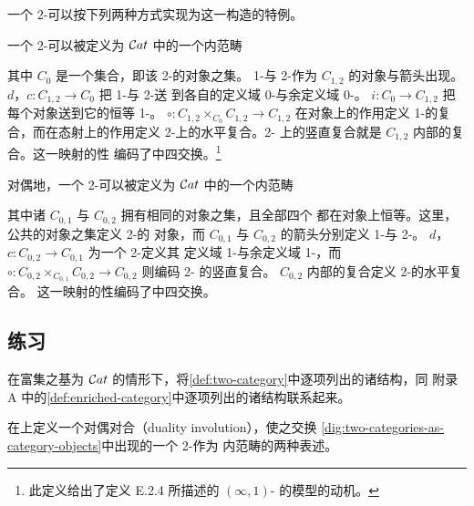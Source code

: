 一个 2-\trCategory{}可以按下列两种方式实现为这一构造的特例。

\begin{digression}\label{dig:two-categories-as-category-objects}
一个 2-\trCategory{}可以被定义为 $\mathcal{C}at$ 中的一个内范畴
\begin{center}
\end{center}
其中\trCategory{} $C_{0}$ 是一个集合，即该 2-\trCategory{}的对象之集。
1-\trCell{}与 2-\trCell{}作为\trCategory{} $C_{1,2}$ 的对象与箭头出现。
\trFunctor{} $d$，$c\colon C_{1,2}\to C_{0}$ 把 1-\trCell{}与 2-\trCell{}送
到各自的定义域 0-\trCell{}与余定义域 0-\trCell。\trFunctor{}
$i\colon C_{0}\to C_{1,2}$ 把每个对象送到它的恒等 1-\trCell。\trFunctor{}
$\circ\colon C_{1,2}\times_{C_{0}}C_{1,2}\to C_{1,2}$ 在对象上的作用定义
1-\trCell{}的复合，而在态射上的作用定义 2-\trCell{}上的水平复合。2-\trCell{}%
上的竖直复合就是\trCategory{} $C_{1,2}$ 内部的复合。这一映射的\trFunctor{}性
编码了中四交换。\footnote{此定义给出了定义 E.2.4 所描述的 $(\infty,1)$-%
\trCategory{}的\trSegalCategories{}模型的动机。}

对偶地，一个 2-\trCategory{}可以被定义为 $\mathcal{C}at$ 中的一个内范畴
\begin{center}
\end{center}
其中诸\trCategory{} $C_{0,1}$ 与 $C_{0,2}$ 拥有相同的对象之集，且全部四个%
\trFunctor{}都在对象上恒等。这里，公共的对象之集定义 2-\trCategory{}的
对象，而 $C_{0,1}$ 与 $C_{0,2}$ 的箭头分别定义 1-\trCell{}与 2-\trCell。
\trFunctor{} $d$，$c\colon C_{0,2}\to C_{0,1}$ 为一个 2-\trCell{}定义其
定义域 1-\trCell{}与余定义域 1-\trCell，而\trFunctor{}
$\circ\colon C_{0,2}\times_{C_{0,1}}C_{0,2}\to C_{0,2}$ 则编码 2-\trCell{}%
的竖直复合。\trCategory{} $C_{0,2}$ 内部的复合定义 2-\trCell{}的水平复合。
这一映射的\trFunctor{}性编码了中四交换。
\end{digression}

\subsection*{练习}

\begin{exercise}\label{ex:relate-two-category-enriched-structures}
在富集之基为 $\mathcal{C}at$ 的情形下，将\cref{def:two-category}中逐项列出的诸结构，同%
附录 A 中的\cref{def:enriched-category}中逐项列出的诸结构联系起来。
\end{exercise}

\begin{exercise}\label{ex:duality-involution-double-categories}
在\trDoubleCategory{}上定义一个对偶对合（duality involution），使之交换%
\cref{dig:two-categories-as-category-objects}中出现的一个 2-\trCategory{}作为%
内范畴的两种表述。
\end{exercise}

